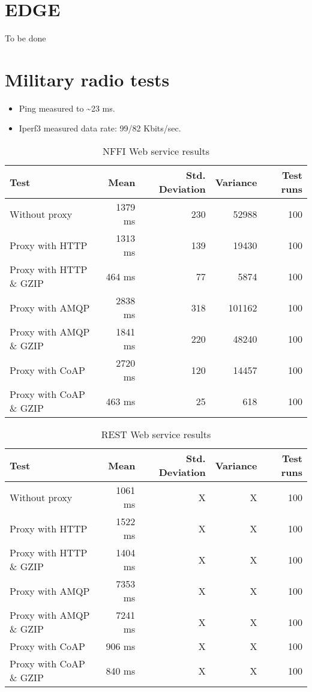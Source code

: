 \begin{appendices}
\section{EDGE}

To be done



\section{Military radio tests}

\begin{itemize}
	\item Ping measured to \textasciitilde 23 ms.
	\item Iperf3 measured data rate: 99/82 Kbits/sec.
\end{itemize}

\begin{table}[H]
\begin{tabular}{| l | r | r | r | r |}
\hline
  \textbf{Test} & \textbf{Mean} & \textbf{Std. Deviation} & \textbf{Variance} & \textbf{Test runs}\\ \hline
  Without proxy & 1379 ms & 230 & 52988 & 100 \\ \hline
  Proxy with HTTP & 1313 ms & 139 & 19430 & 100 \\ \hline
  Proxy with HTTP \& GZIP & 464 ms & 77 & 5874 & 100 \\ \hline
  Proxy with AMQP & 2838 ms & 318 & 101162 & 100 \\ \hline
  Proxy with AMQP \& GZIP & 1841 ms & 220 & 48240 & 100\\ \hline
  Proxy with CoAP & 2720 ms & 120 & 14457 & 100 \\ \hline
  Proxy with CoAP \& GZIP & 463 ms & 25 & 618 & 100 \\ \hline
\end{tabular}
\caption{NFFI Web service results}
\end{table}


\begin{table}[H]
\begin{tabular}{| l | r | r | r | r |}
\hline
  \textbf{Test} & \textbf{Mean} & \textbf{Std. Deviation} & \textbf{Variance} & \textbf{Test runs}\\ \hline
  Without proxy & 1061 ms & X & X & 100 \\ \hline
  Proxy with HTTP & 1522 ms & X & X & 100 \\ \hline
  Proxy with HTTP \& GZIP & 1404 ms & X & X & 100 \\ \hline
  Proxy with AMQP & 7353 ms & X & X & 100 \\ \hline
  Proxy with AMQP \& GZIP & 7241 ms & X & X & 100\\ \hline
  Proxy with CoAP & 906 ms & X & X & 100 \\ \hline
  Proxy with CoAP \& GZIP & 840 ms & X & X & 100 \\ \hline
\end{tabular}
\caption{REST Web service results}
\end{table}



\end{appendices}